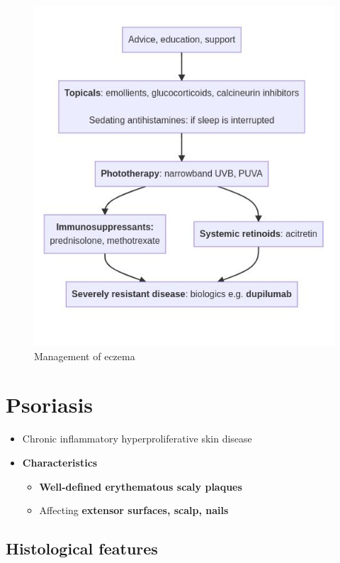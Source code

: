 \documentclass[
  12pt,
]{memoir}
\providecommand{\tightlist}{%
  \setlength{\itemsep}{0pt}\setlength{\parskip}{0pt}}
\begin{document}
\begin{figure}[h!]
\centering
\includegraphics[width=.7\textwidth]{../assets/med/eczema.jpg}
\vspace{-10mm}
\caption{Management of eczema}
\end{figure}

\pagebreak

\hypertarget{psoriasis}{%
\section{Psoriasis}\label{psoriasis}}

\begin{itemize}
\tightlist
\item
  Chronic inflammatory hyperproliferative skin disease
\item
  \textbf{Characteristics}

  \begin{itemize}
  \tightlist
  \item
    \textbf{Well-defined erythematous scaly plaques}
  \item
    Affecting \textbf{extensor surfaces, scalp, nails}
  \end{itemize}
\end{itemize}

\hypertarget{histological-features}{%
\subsection{Histological features}\label{histological-features}}
\end{document}
